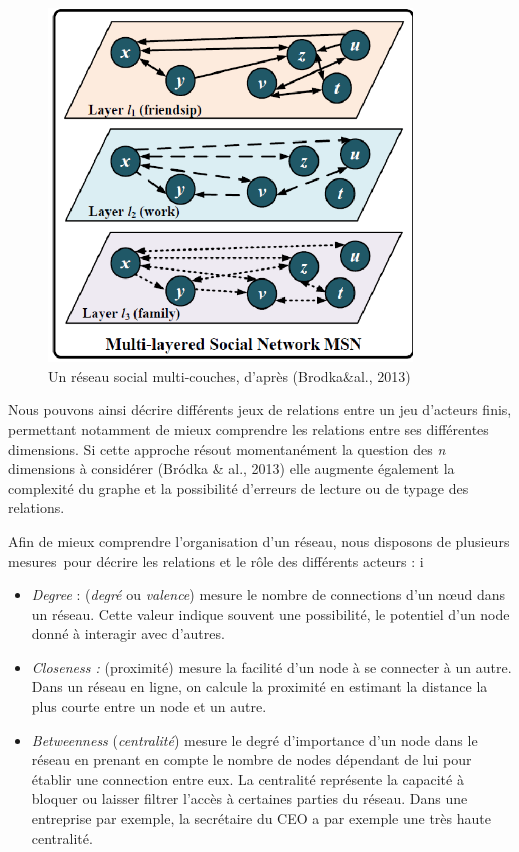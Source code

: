 \begin{figure}
    \centering
    \includegraphics[width=3.8004in,height=3.6894in]{figures/chap3/chapitre3-img3.png}
    \caption [r\'eseau social multi-couches] {Un r\'eseau social multi-couches, d{\textquoteright}apr\`es (Brodka\&al., 2013)}
\end{figure}

Nous pouvons ainsi d\'ecrire diff\'erents jeux de relations entre un jeu
d{\textquoteright}acteurs finis, permettant notamment de mieux
comprendre les relations entre ses diff\'erentes dimensions. Si cette
approche r\'esout momentan\'ement la question des \textit{n }dimensions
\`a consid\'erer (Br\'odka \& al., 2013) elle augmente \'egalement la
complexit\'e du graphe et la possibilit\'e d{\textquoteright}erreurs de
lecture ou de typage des relations. 

Afin de mieux comprendre l{\textquoteright}organisation
d{\textquoteright}un r\'eseau, nous disposons de plusieurs mesures~pour
d\'ecrire les relations et le r\^ole des diff\'erents acteurs : 
i
\begin{itemize}
\item \textit{Degree} : (\textit{degr\'e} ou \textit{valence}) mesure le
nombre de connections d{\textquoteright}un n{\oe}ud dans un r\'eseau.
Cette valeur indique souvent une possibilit\'e, le potentiel
d{\textquoteright}un node donn\'e \`a interagir avec
d{\textquoteright}autres. 
\item \textit{Closeness : }(proximit\'e) mesure la facilit\'e
d{\textquoteright}un node \`a se connecter \`a un autre. Dans un
r\'eseau en ligne, on calcule la proximit\'e en estimant la distance la
plus courte entre un node et un autre. 
\item \textit{Betweenness} (\textit{centralit\'e}) mesure le degr\'e
d{\textquoteright}importance d{\textquoteright}un node dans le r\'eseau
en prenant en compte le nombre de nodes d\'ependant de lui pour
\'etablir une connection entre eux. La centralit\'e repr\'esente la
capacit\'e \`a bloquer ou laisser filtrer l{\textquoteright}acc\`es \`a
certaines parties du r\'eseau. Dans une entreprise par exemple, la
secr\'etaire du CEO a par exemple une tr\`es haute centralit\'e.
\end{itemize}


